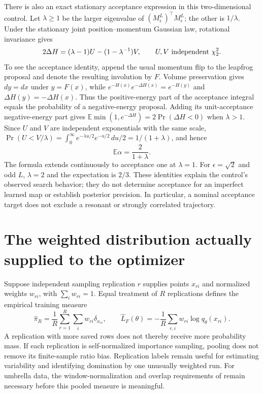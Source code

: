 There is also an exact stationary acceptance expression in this two-dimensional
control. Let $\lambda\geq1$ be the larger eigenvalue of
$(M_\epsilon^L)^\top M_\epsilon^L$; the other is $1/\lambda$. Under the
stationary joint position--momentum Gaussian law, rotational invariance gives
\begin{equation}
 2\Delta H=(\lambda-1)U-(1-\lambda^{-1})V,
 \qquad U,V\ \hbox{independent }\chi^2_2.
\end{equation}
To see the acceptance identity, append the usual momentum flip to the
leapfrog proposal and denote the resulting involution by $F$. Volume
preservation gives $dy=dx$ under $y=F(x)$, while
$e^{-H(x)}e^{-\Delta H(x)}=e^{-H(y)}$ and
$\Delta H(y)=-\Delta H(x)$. Thus the positive-energy part of the acceptance
integral equals the probability of a negative-energy proposal. Adding its
unit-acceptance negative-energy part gives
$\mathbb E\min(1,e^{-\Delta H})=2\Pr(\Delta H<0)$ when $\lambda>1$.
Since $U$ and $V$ are independent exponentials with the same scale,
$\Pr(U<V/\lambda)=\int_0^\infty e^{-\lambda u/2}
 e^{-u/2}\,du/2=1/(1+\lambda)$, and hence
\begin{equation}
 \mathbb E\alpha=\frac{2}{1+\lambda}.
\end{equation}
The formula extends continuously to acceptance one at $\lambda=1$.
For $\epsilon=\sqrt2$ and odd $L$, $\lambda=2$ and the expectation is
$2/3$. These identities explain the control's observed search behavior; they
do not determine acceptance for an imperfect learned map or establish
posterior precision. In particular, a nominal acceptance target does not
exclude a resonant or strongly correlated trajectory.

\section[The training distribution]{The weighted distribution actually supplied to the optimizer}

Suppose independent sampling replication $r$ supplies points $x_{ri}$ and
normalized weights $w_{ri}$, with $\sum_i w_{ri}=1$. Equal treatment of $R$
replications defines the empirical training measure
\begin{equation}
 \widehat\pi_R=\frac{1}{R}\sum_{r=1}^{R}\sum_iw_{ri}\delta_{x_{ri}},
 \qquad
 \widehat L_F(\theta)=-\frac{1}{R}\sum_{r,i}w_{ri}\log q_\theta(x_{ri}).
 \label{eq:controlled-pooled-teacher}
\end{equation}
A replication with more saved rows does not thereby receive more probability
mass. If each replication is self-normalized importance sampling, pooling
does not remove its finite-sample ratio bias. Replication labels remain useful
for estimating variability and identifying domination by one unusually
weighted run. For umbrella data, the window-normalization and overlap
requirements of \citet{thiede2016emus} remain necessary before this pooled
measure is meaningful.

